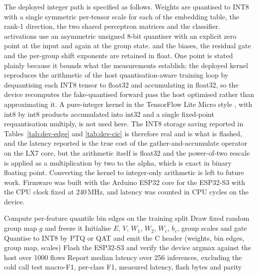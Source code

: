 \documentclass[10pt,letterpaper,twocolumn]{article}
\begin{document}
The deployed integer path is specified as follows. Weights are quantised to
INT8 with a single symmetric per-tensor scale for each of the embedding table,
the rank-1 direction, the two shared perceptron matrices and the classifier.
activations use an asymmetric unsigned 8-bit quantiser with an explicit zero
point at the input and again at the group state. and the biases, the residual
gate and the per-group shift exponents are retained in float. One point is
stated plainly because it bounds what the measurements establish: the deployed
kernel reproduces the arithmetic of the host quantisation-aware training loop
by dequantising each INT8 tensor to float32 and accumulating in float32, so the
device recomputes the fake-quantised forward pass the host optimised rather
than approximating it. A pure-integer kernel in the TensorFlow Lite Micro style
\cite{david2021tflm}, with int8 by int8 products accumulated into int32 and a
single fixed-point requantisation multiply, is not used here. The INT8 storage
saving reported in Tables~\ref{tab:dev-edge} and \ref{tab:dev-cic} is therefore
real and is what is flashed, and the latency reported is the true cost of the
gather-and-accumulate operator on the LX7 core, but the arithmetic itself is
float32 and the power-of-two rescale is applied as a multiplication by two to
the alpha, which is exact in binary floating point. Converting the kernel to
integer-only arithmetic is left to future work. Firmware was built with the
Arduino ESP32 core for the ESP32-S3 with the CPU clock fixed at 240\,MHz, and
latency was counted in CPU cycles on the device.

\begin{algorithm}[!ht]
\caption{ATOM training and on-device evaluation.}
\label{alg:atom}
Compute per-feature quantile bin edges on the training split\;
Draw fixed random group map $g$ and freeze it\;
Initialise $E$, $V$, $W_{1}$, $W_{2}$, $W_{c}$, $b_{c}$, group scales and gate\;
Quantise to INT8 by PTQ or QAT and emit the C header (weights, bin edges, group map, scales)\;
Flash the ESP32-S3 and verify the device argmax against the host over 1000 flows\;
Report median latency over 256 inferences, excluding the cold call\;
\Return test macro-F1, per-class F1, measured latency, flash bytes and parity\;
\end{algorithm}
\end{document}
